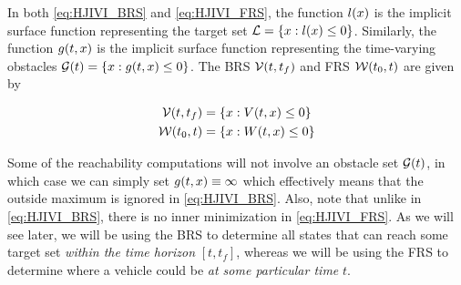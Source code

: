 In both \eqref{eq:HJIVI_BRS} and \eqref{eq:HJIVI_FRS}, the function $l(x)$ is the implicit surface function representing the target set $\mathcal{L} = \{x: l(x) \le 0\}$. Similarly, the function $g(t, x)$ is the implicit surface function representing the time-varying obstacles $\mathcal{G}(t) = \{x: g(t,x)\le 0\}$. The BRS $\mathcal{V}(t, t_f)$ and FRS $\mathcal{W}(t_0, t)$ are given by

\begin{equation}
\label{eq:implicitValfuncs}
\begin{aligned}
\brs(t, t_f) &= \{\state: \valfunc(t, \state) \le 0\} \\
\frs(t_0, t) &= \{\state: \valfuncfwd(t, \state) \le 0 \}
\end{aligned}
\end{equation}

Some of the reachability computations will not involve an obstacle set $\mathcal{G}(t)$, in which case we can simply set $g(t, x) \equiv \infty$ which effectively means that the outside maximum is ignored in \eqref{eq:HJIVI_BRS}. Also, note that unlike in \eqref{eq:HJIVI_BRS}, there is no inner minimization in \eqref{eq:HJIVI_FRS}. As we will see later, we will be using the BRS to determine all states that can reach some target set \textit{within the time horizon} $[t,t_f]$, whereas we will be using the FRS to determine where a vehicle could be \textit{at some particular time} $t$. %
%
%

